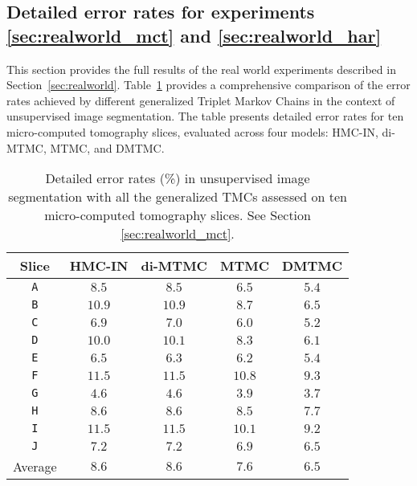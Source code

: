 \vspace{0.7cm}
\tocless\subsection{Detailed error rates for experiments \ref{sec:realworld_mct} and \ref{sec:realworld_har} }
\label{app:error_rates}
This section provides the full results of the real world experiments described in 
Section~\ref{sec:realworld}.
Table~\ref{table:microct_scores_all} 
provides a comprehensive comparison of the error rates achieved by
different generalized Triplet Markov Chains in the context of
unsupervised image segmentation. The table presents detailed error rates for ten
micro-computed tomography slices, evaluated across four models: HMC-IN, di-MTMC,
MTMC, and DMTMC.

\newpage
\begin{table}[htb!]
\centering
\setlength\tabcolsep{6pt}
\begin{tabular}{ccccc}
\toprule
Slice & HMC-IN & di-MTMC & MTMC & DMTMC \\\toprule
\texttt{A}&	$8.5$&	$8.5$&	$6.5$&	$5.4$\\ \midrule
\texttt{B}&	$10.9$&	$10.9$&	$8.7$&	$6.5$\\ \midrule
\texttt{C}&	$6.9$&	$7.0$&	$6.0$&	$5.2$\\ \midrule
\texttt{D}&	$10.0$&	$10.1$&	$8.3$&	$6.1$\\ \midrule
\texttt{E}&	$6.5$&	$6.3$&	$6.2$&	$5.4$\\ \midrule
\texttt{F}&	$11.5$&	$11.5$&	$10.8$&	$9.3$\\ \midrule
\texttt{G}&	$4.6$&	$4.6$&	$3.9$&	$3.7$\\ \midrule
\texttt{H} & $8.6$ & $8.6$ & $8.5$ & $7.7$\\ \midrule
\texttt{I} & $11.5$ & $11.5$ & $10.1$ & $9.2$ \\ \midrule
\texttt{J}& $7.2$ & $7.2$ & $6.9$ & $6.5$\\ \midrule \midrule
Average & $8.6$ & $8.6$ & $7.6$ & $\pmb{6.5}$\\
\bottomrule
\end{tabular}
\caption{Detailed error rates (\%) in unsupervised image segmentation with all the generalized TMCs assessed on ten micro-computed tomography slices. See Section \ref{sec:realworld_mct}.}
\label{table:microct_scores_all}
\end{table}

